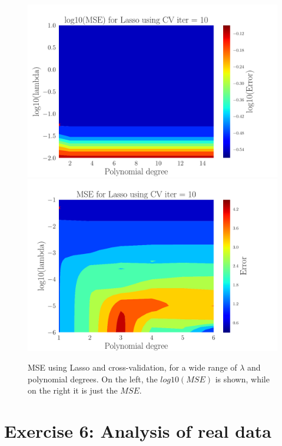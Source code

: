 \documentclass[reprint,english,notitlepage,aps,nobalancelastpage,nofootinbib]{revtex4-1}  %
\begin{document}
\begin{figure}[h]
	\includegraphics[width=\linewidth]{Contour_PL_Lasso_CV10_n30_eps0.2_p1_15_lmb1_m2.pdf}
	\endminipage\hfill
	\includegraphics[width=\linewidth]{Contour_PL_Lasso_CV10_n30_eps0.2_p1_6_lmbm1_m6.pdf}
	\endminipage
	\caption{MSE using Lasso and cross-validation, for a wide range of $\lambda$ and polynomial degrees. On the left, the $log10(MSE)$ is shown, while on the right it is just the $MSE$.}
	\label{fig:Lasso_CV_heatmaps}
\end{figure}


\section*{Exercise 6: Analysis of real data}
\end{document}
